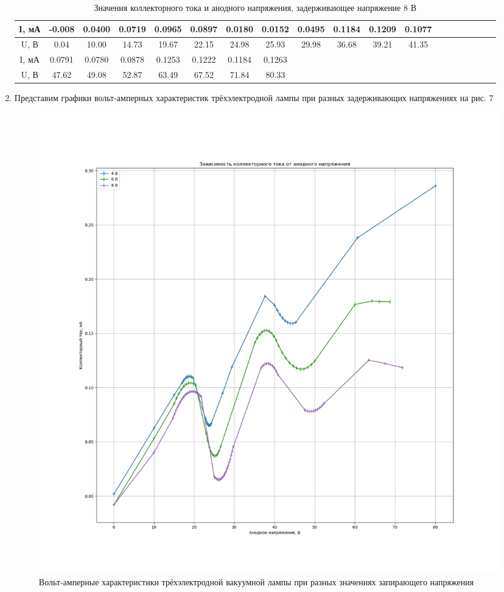 \documentclass[a4paper, 12pt]{article}
\begin{document}
\begin{enumerate}
\begin{table}[h]
\begin{tabular}{|c|c|c|c|c|c|c|c|c|c|c|c|c|c|c|c|c|c|c|}
 
\end{tabular}
\end{table}

    \begin{table}[h]
    \centering
    \begin{center}
    \caption{Значения коллекторного тока и анодного напряжения, задерживающее напряжение 8 В}
    \end{center}
    \vspace{0.1cm}
    \label{tab:my_label}
    \begin{tabular}{|c|c|c|c|c|c|c|c|c|c|c|c|c|c|c|c|c|c|c|}
 \hline
I, мА & -0.008 & 0.0400 & 0.0719 & 0.0965 & 0.0897 & 0.0180 & 0.0152 & 0.0495 & 0.1184 & 0.1209 & 0.1077 \\ \hline
U, В & 0.04 & 10.00 & 14.73 & 19.67 & 22.15 & 24.98 & 25.93 & 29.98 & 36.68 & 39.21 & 41.35 \\ \hline
\hline
I, мА  & 0.0791 & 0.0780 & 0.0878 & 0.1253 & 0.1222 & 0.1184 & 0.1263 & & & & \\ \hline
U, В & 47.62 & 49.08 & 52.87 & 63.49 & 67.52 & 71.84 & 80.33 & & & & \\ \hline
 
\end{tabular}
\end{table}

\item Представим графики вольт-амперных характеристик трёхэлектродной лампы при разных задерживающих напряжениях на рис. 7

\begin{figure}[h]
    \centering
    \includegraphics[width=\textwidth]{graph4.png}
    \caption{Вольт-амперные характеристики трёхэлектродной вакуумной лампы при разных значениях запирающего напряжения}
    \label{fig:vac}
\end{figure}


\end{enumerate}
\end{document}
